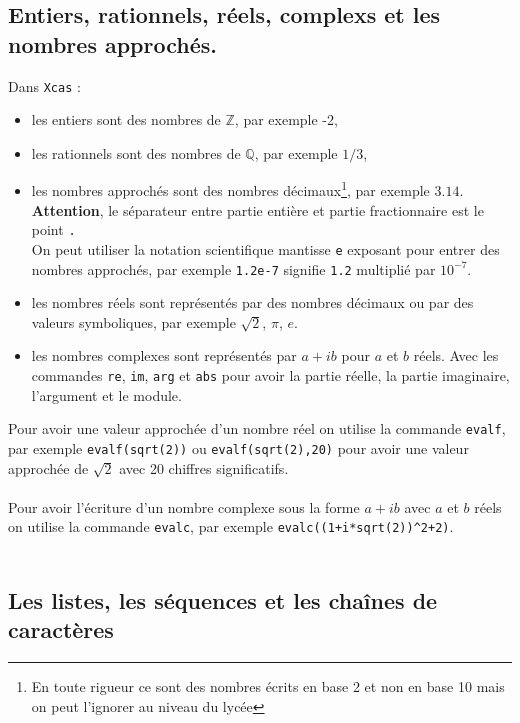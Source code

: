 \documentclass[12pt,a4paper]{book}
\begin{document}
\begin{giacjshere}
\subsection{Entiers, rationnels, r\'eels, complexs  et les nombres approch\'es.}
Dans {\tt Xcas} :
\begin{itemize}
\item les entiers sont des nombres de $\mathbb{Z}$, par exemple -2,
\item les rationnels sont des nombres de $\mathbb{Q}$, par exemple $1/3$,
\item les nombres approch\'es sont des nombres d\'ecimaux\footnote{En toute rigueur ce sont des nombres \'ecrits en base 2 et non en base 10 mais on peut l'ignorer au niveau du lyc\'ee}, par exemple $3.14$.\\
{\bf Attention}, le s\'eparateur entre
partie enti\`ere et partie fractionnaire est le point \verb|.|\\
On peut utiliser la notation scientifique mantisse \verb|e| exposant
pour entrer des nombres approch\'es, par exemple \verb|1.2e-7|
signifie \verb|1.2| multipli\'e par $10^{-7}$.
\item les nombres r\'eels sont repr\'esent\'es par des nombres d\'ecimaux ou 
par des valeurs symboliques, par exemple $\sqrt 2$, $\pi$, $e$.
\item les nombres complexes sont repr\'esent\'es par $a+ib$ pour $a$ et $b$ 
r\'eels. Avec les commandes {\tt re}, {\tt im}, {\tt arg} et {\tt abs} pour 
avoir la partie r\'eelle, la partie imaginaire, l'argument et le module.
\end{itemize}
Pour avoir une valeur approch\'ee d'un nombre r\'eel on utilise la commande
{\tt evalf}, par exemple {\tt evalf(sqrt(2))} ou {\tt evalf(sqrt(2),20)} pour 
avoir  une valeur approch\'ee de $\sqrt 2$ avec 20 chiffres significatifs.\\
\\
Pour avoir l'\'ecriture d'un nombre complexe sous la forme $a+ib$ avec $a$ et 
$b$ r\'eels on utilise la commande {\tt evalc}, par exemple 
{\tt evalc((1+i*sqrt(2))\verb|^|2+2)}.\\
\\
\subsection{Les listes, les s\'equences et les cha\^ines de caract\`eres}

\end{giacjshere}
\end{document}
